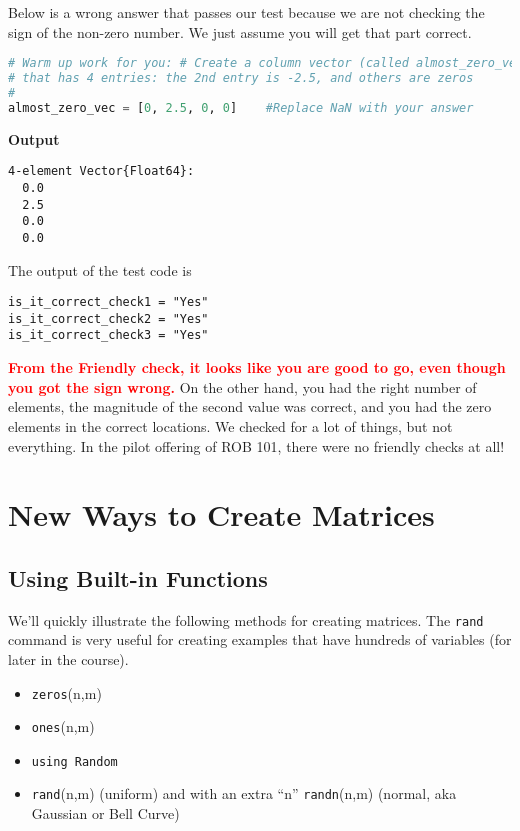 Below is a wrong answer that passes our test because we are not checking the sign of the non-zero number. We just assume you will get that part correct. 

\begin{lstlisting}[language=Julia,style=mystyle]
# Warm up work for you: # Create a column vector (called almost_zero_vec) 
# that has 4 entries: the 2nd entry is -2.5, and others are zeros
# 
almost_zero_vec = [0, 2.5, 0, 0]    #Replace NaN with your answer
\end{lstlisting}
\textbf{Output} 
\begin{verbatim}
4-element Vector{Float64}:
  0.0
  2.5
  0.0
  0.0
\end{verbatim}

The output of the test code is 
\begin{verbatim}
is_it_correct_check1 = "Yes"
is_it_correct_check2 = "Yes"
is_it_correct_check3 = "Yes"
\end{verbatim}

\textcolor{red}{\bf From the Friendly check, it looks like you are good to go, even though you got the sign wrong.} On the other hand, you had the right number of elements, the magnitude of the second value was correct, and you had the zero elements in the correct locations. We checked for a lot of things, but not everything. In the pilot offering of ROB 101, there were no friendly checks at all! 

\section{New Ways to Create Matrices}

\subsection{Using Built-in Functions}

We'll quickly illustrate the following methods for creating matrices. The \texttt{rand} command is very useful for creating examples that have hundreds of variables (for later in the course).
\begin{itemize}
\item \texttt{zeros}(n,m)
\item \texttt{ones}(n,m)
\item \texttt{using Random}
\item  \texttt{rand}(n,m) (uniform) and with an extra ``n'' \texttt{randn}(n,m) (normal, aka Gaussian or Bell Curve)
    \end{itemize}


